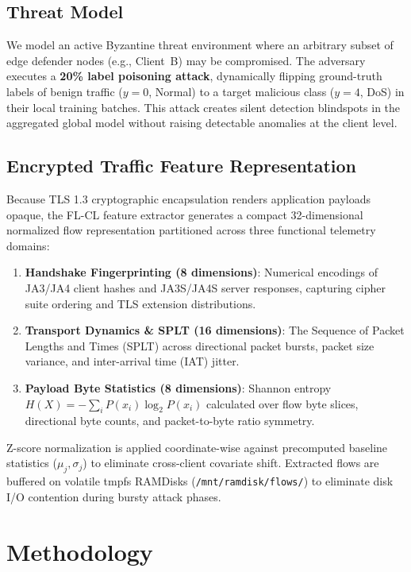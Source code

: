 \documentclass[journal,10pt,twocolumn]{IEEEtran}
\begin{document}
\subsection{Threat Model}
We model an active Byzantine threat environment where an arbitrary subset of edge defender nodes (e.g., Client~B) may be compromised. The adversary executes a \textbf{20\% label poisoning attack}, dynamically flipping ground-truth labels of benign traffic ($y=0$, Normal) to a target malicious class ($y=4$, DoS) in their local training batches. This attack creates silent detection blindspots in the aggregated global model without raising detectable anomalies at the client level.

\subsection{Encrypted Traffic Feature Representation}
Because TLS 1.3 cryptographic encapsulation renders application payloads opaque, the FL-CL feature extractor generates a compact 32-dimensional normalized flow representation partitioned across three functional telemetry domains:
\begin{enumerate}
    \item \textbf{Handshake Fingerprinting (8 dimensions)}: Numerical encodings of JA3/JA4 client hashes and JA3S/JA4S server responses, capturing cipher suite ordering and TLS extension distributions.
    \item \textbf{Transport Dynamics \& SPLT (16 dimensions)}: The Sequence of Packet Lengths and Times (SPLT) across directional packet bursts, packet size variance, and inter-arrival time (IAT) jitter.
    \item \textbf{Payload Byte Statistics (8 dimensions)}: Shannon entropy $H(X) = -\sum_{i} P(x_i) \log_2 P(x_i)$ calculated over flow byte slices, directional byte counts, and packet-to-byte ratio symmetry.
\end{enumerate}
Z-score normalization is applied coordinate-wise against precomputed baseline statistics ($\mu_j, \sigma_j$) to eliminate cross-client covariate shift. Extracted flows are buffered on volatile tmpfs RAMDisks (\texttt{/mnt/ramdisk/flows/}) to eliminate disk I/O contention during bursty attack phases.

\section{Methodology}
\end{document}
